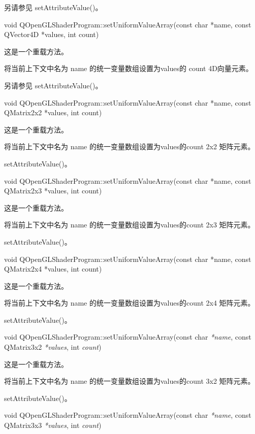 另请参见 setAttributeValue()。

void QOpenGLShaderProgram::setUniformValueArray(const char *name, const QVector4D *values, int count)

这是一个重载方法。

将当前上下文中名为 name 的统一变量数组设置为values的 count 4D向量元素。

另请参见 setAttributeValue()。

void QOpenGLShaderProgram::setUniformValueArray(const char *name, const QMatrix2x2 *values, int count)

这是一个重载方法。

将当前上下文中名为 name 的统一变量数组设置为values的count 2x2 矩阵元素。

\begin{seeAlso}
setAttributeValue()。
\end{seeAlso}

void QOpenGLShaderProgram::setUniformValueArray(const char *name, const QMatrix2x3 *values, int count)

这是一个重载方法。

将当前上下文中名为 name 的统一变量数组设置为values的count 2x3 矩阵元素。

\begin{seeAlso}
setAttributeValue()。
\end{seeAlso}

void QOpenGLShaderProgram::setUniformValueArray(const char *name, const QMatrix2x4 *values, int count)

这是一个重载方法。

将当前上下文中名为 name 的统一变量数组设置为values的count 2x4 矩阵元素。

\begin{seeAlso}
setAttributeValue()。
\end{seeAlso}

void QOpenGLShaderProgram::setUniformValueArray(const char \emph{*name}, const QMatrix3x2 \emph{*values}, int \emph{count})

这是一个重载方法。

将当前上下文中名为 name 的统一变量数组设置为values的count 3x2 矩阵元素。

\begin{seeAlso}
setAttributeValue()。
\end{seeAlso}

void QOpenGLShaderProgram::setUniformValueArray(const char \emph{*name}, const QMatrix3x3 \emph{*values}, int \emph{count})

